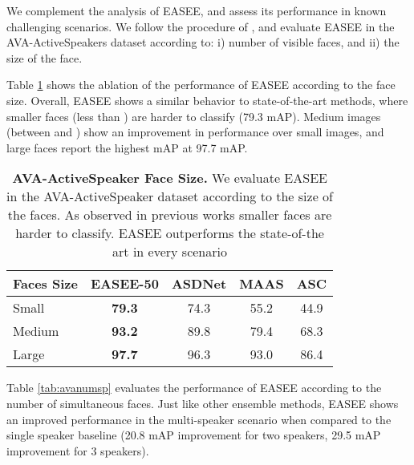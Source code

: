 \documentclass[10pt,twocolumn,letterpaper]{article}
\begin{document}
We complement the analysis of EASEE, and assess its performance in known challenging scenarios. We follow the procedure of \cite{roth2020ava}, and evaluate EASEE in the AVA-ActiveSpeakers dataset according to: i) number of visible faces, and ii) the size of the face.

Table \ref{tab:ava_size}  shows the ablation of the  performance of EASEE according to the face size. Overall, EASEE shows a similar behavior to state-of-the-art methods, where smaller faces (less than ) are harder to classify (79.3 mAP). Medium images  (between  and ) show an improvement in performance over small images, and large faces report the highest mAP at {97.7 mAP}.

\begin{table}[h]
    \centering
    \footnotesize
      \begin{tabular}{l c c c c }
        \hline
        \textbf{Faces Size} \qquad & \textbf{EASEE-50} & \textbf{ASDNet} \cite{kopuklu2021design} & \textbf{MAAS} \cite{leon2021maas} & \textbf{ASC}  \cite{alcazar2020active} \\
        \hline 
        Small & \textbf{79.3} & 74.3 & 55.2 & 44.9 \\
        Medium & \textbf{93.2} & 89.8 & 79.4 & 68.3  \\
        Large &  \textbf{97.7} & 96.3 & 93.0 & 86.4  \\
        \hline
    \end{tabular}
    \caption{
        \textbf{AVA-ActiveSpeaker Face Size.}
        We evaluate EASEE in the AVA-ActiveSpeaker dataset according to the size of the faces. As observed in previous works smaller faces are harder to classify. EASEE
        outperforms the state-of-the art in every scenario
    }
    \label{tab:ava_size}
\end{table}


Table \ref{tab:avanumsp} evaluates the performance of EASEE according to the number of simultaneous faces. Just like other ensemble methods, EASEE shows an improved performance in the multi-speaker scenario when compared to the single speaker baseline \cite{roth2020ava} (20.8 mAP improvement for two speakers, 29.5 mAP improvement for 3 speakers). 
\end{document}
